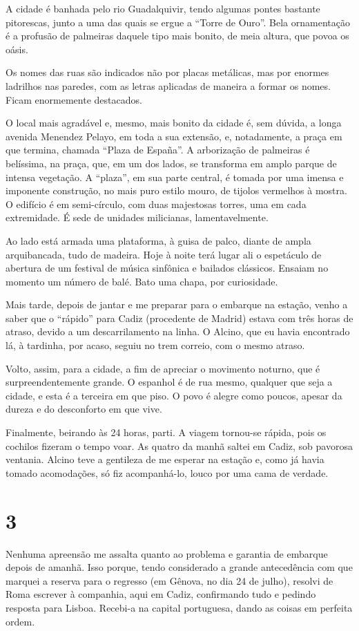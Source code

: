 A cidade é banhada pelo rio Guadalquivir, tendo algumas pontes bastante pitorescas, junto a uma das quais se ergue a “Torre de Ouro”. Bela ornamentação é a profusão de palmeiras daquele tipo mais bonito, de meia altura, que povoa os oásis.

Os nomes das ruas são indicados não por placas metálicas, mas por enormes ladrilhos nas paredes, com as letras aplicadas de maneira a formar os nomes. Ficam enormemente destacados.

O local mais agradável e, mesmo, mais bonito da cidade é, sem dúvida, a longa avenida Menendez Pelayo, em toda a sua extensão, e, notadamente, a praça em que termina, chamada “Plaza de España”. A arborização de palmeiras é belíssima, na praça, que, em um dos lados, se transforma em amplo parque de intensa vegetação. A “plaza”, em sua parte central, é tomada por uma imensa e imponente construção, no mais puro estilo mouro, de tijolos vermelhos à mostra. O edifício é em semi-círculo, com duas majestosas torres, uma em cada extremidade. É sede de unidades milicianas, lamentavelmente.

Ao lado está armada uma plataforma, à guisa de palco, diante de ampla arquibancada, tudo de madeira. Hoje à noite terá lugar ali o espetáculo de abertura de um festival de música sinfônica e bailados clássicos. Ensaiam no momento um número de balé. Bato uma chapa, por curiosidade.

Mais tarde, depois de jantar e me preparar para o embarque na estação, venho a saber que o “rápido” para Cadiz (procedente de Madrid) estava com três horas de atraso, devido a um descarrilamento na linha. O Alcino, que eu havia encontrado lá, à tardinha, por acaso, seguiu no trem correio, com o mesmo atraso.

Volto, assim, para a cidade, a fim de apreciar o movimento noturno, que é surpreendentemente grande. O espanhol é de rua mesmo, qualquer que seja a cidade, e esta é a terceira em que piso. O povo é alegre como poucos, apesar da dureza e do desconforto em que vive.

Finalmente, beirando às 24 horas, parti. A viagem tornou-se rápida, pois os cochilos fizeram o tempo voar. As quatro da manhã saltei em Cadiz, sob pavorosa ventania. Alcino teve a gentileza de me esperar na estação e, como já havia tomado acomodações, só fiz acompanhá-lo, louco por uma cama de verdade.

\section*{3 \adfflatleafright {}}
Nenhuma apreensão me assalta quanto ao problema e garantia de embarque depois de amanhã. Isso porque, tendo considerado a grande antecedência com que marquei a reserva para o regresso (em Gênova, no dia 24 de julho), resolvi de Roma escrever à companhia, aqui em Cadiz, confirmando tudo e pedindo resposta para Lisboa. Recebi-a na capital portuguesa, dando as coisas em perfeita ordem.

